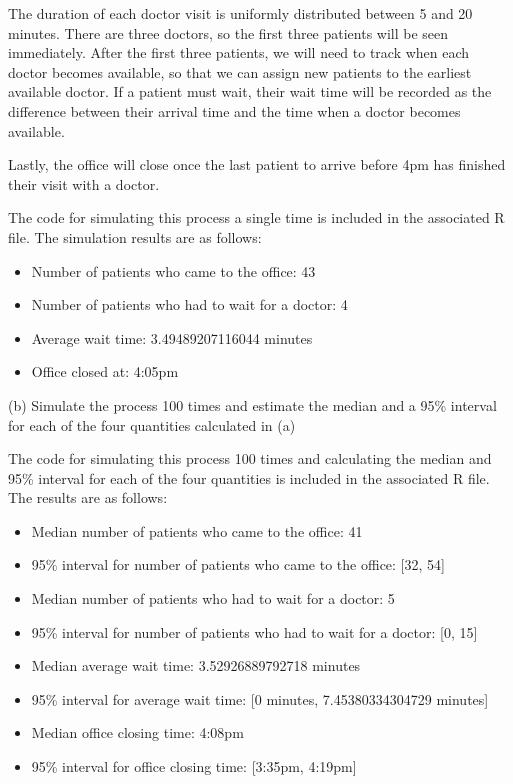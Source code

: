 \documentclass[12pt]{article}
\begin{document}
The duration of each doctor visit is uniformly distributed between 5 and 20 minutes. There are three doctors, so the first
three patients will be seen immediately. After the first three patients, we will need to track when each doctor becomes 
available, so that we can assign new patients to the earliest available doctor. If a patient must wait, their wait time will
be recorded as the difference between their arrival time and the time when a doctor becomes available.

Lastly, the office will close once the last patient to arrive before 4pm has finished their visit with a doctor.

The code for simulating this process a single time is included in the associated R file. 
The simulation results are as follows:

\begin{itemize}
\item Number of patients who came to the office: 43
\item Number of patients who had to wait for a doctor: 4
\item Average wait time: 3.49489207116044 minutes
\item Office closed at: 4:05pm
\end{itemize}

(b) Simulate the process 100 times and estimate the median and a 95\% interval for each of the four quantities calculated in (a)

The code for simulating this process 100 times and calculating the median and 95\% interval for each of the four quantities
is included in the associated R file. The results are as follows:

\begin{itemize}
\item Median number of patients who came to the office: 41
\item 95\% interval for number of patients who came to the office: [32, 54]
\item Median number of patients who had to wait for a doctor: 5
\item 95\% interval for number of patients who had to wait for a doctor: [0, 15]
\item Median average wait time: 3.52926889792718 minutes
\item 95\% interval for average wait time: [0 minutes, 7.45380334304729 minutes]
\item Median office closing time: 4:08pm
\item 95\% interval for office closing time: [3:35pm, 4:19pm]
\end{itemize}
\end{document}
